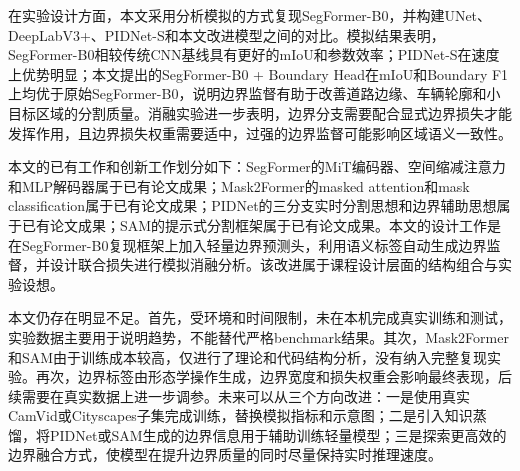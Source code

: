 \documentclass{report}
\begin{document}
在实验设计方面，本文采用分析模拟的方式复现SegFormer-B0，并构建UNet、DeepLabV3+、PIDNet-S和本文改进模型之间的对比。模拟结果表明，SegFormer-B0相较传统CNN基线具有更好的mIoU和参数效率；PIDNet-S在速度上优势明显；本文提出的SegFormer-B0 + Boundary Head在mIoU和Boundary F1上均优于原始SegFormer-B0，说明边界监督有助于改善道路边缘、车辆轮廓和小目标区域的分割质量。消融实验进一步表明，边界分支需要配合显式边界损失才能发挥作用，且边界损失权重需要适中，过强的边界监督可能影响区域语义一致性。

本文的已有工作和创新工作划分如下：SegFormer的MiT编码器、空间缩减注意力和MLP解码器属于已有论文成果；Mask2Former的masked attention和mask classification属于已有论文成果；PIDNet的三分支实时分割思想和边界辅助思想属于已有论文成果；SAM的提示式分割框架属于已有论文成果。本文的设计工作是在SegFormer-B0复现框架上加入轻量边界预测头，利用语义标签自动生成边界监督，并设计联合损失进行模拟消融分析。该改进属于课程设计层面的结构组合与实验设想。

本文仍存在明显不足。首先，受环境和时间限制，未在本机完成真实训练和测试，实验数据主要用于说明趋势，不能替代严格benchmark结果。其次，Mask2Former和SAM由于训练成本较高，仅进行了理论和代码结构分析，没有纳入完整复现实验。再次，边界标签由形态学操作生成，边界宽度和损失权重会影响最终表现，后续需要在真实数据上进一步调参。未来可以从三个方向改进：一是使用真实CamVid或Cityscapes子集完成训练，替换模拟指标和示意图；二是引入知识蒸馏，将PIDNet或SAM生成的边界信息用于辅助训练轻量模型；三是探索更高效的边界融合方式，使模型在提升边界质量的同时尽量保持实时推理速度。
\end{document}
